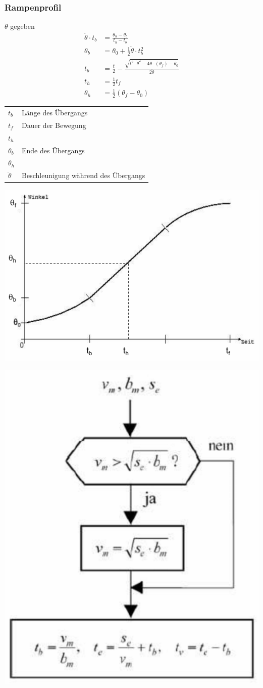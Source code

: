 \subsubsection{Rampenprofil}
\begin{minipage}{0.5\linewidth}
    {\small 
    $\ddot{\theta}$ gegeben\newline
    \begin{align*}
        \ddot{\theta}\cdot t_b &= \frac{\theta_h-\theta_b}{t_h - t_b}\\
        \theta_b &=\theta_0 + \frac{1}{2}\ddot{\theta}\cdot t_b^2\\
        t_b &= \frac{t}{2}- \frac{\sqrt{t^2\cdot \ddot{\theta}^2-4\ddot{\theta}\cdot(\theta_f)- \theta_0}}{2\ddot{\theta}}\\
        t_h &= \frac{1}{2}t_f\\
        \theta_h &=\frac{1}{2}(\theta_f -\theta_0)
    \end{align*}
    \begin{tabular}{ll}
        $t_b$ & Länge des Übergangs\\
        $t_f$ & Dauer der Bewegung\\
        $t_h$ & \\
        $\theta_b$& Ende des Übergangs\\
        $\theta_h$& \\
        $\ddot{\theta}$& Beschleunigung während des Übergangs\\
    \end{tabular}}
\end{minipage}
\begin{minipage}{0.5\linewidth}
    \includegraphics[width=\linewidth]{./bilder/RampenprofilInterpol}
\end{minipage}
\includegraphics[width=0.25\linewidth]{./bilder/RampenVorgehn}

